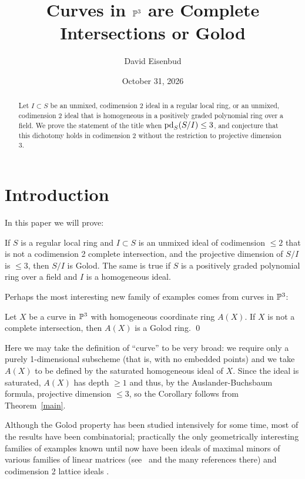 \documentclass[11pt]{amsart}
\title{Curves in \texorpdfstring{${\mathbb P}^{3}$}{P3} are Complete Intersections or Golod}
\date{October 31, 2026}                                           %
\author[D. Eisenbud]{David Eisenbud}
\begin{document}
\begin{abstract}
Let $I\subset S$ be an unmixed, codimension 2 ideal in a regular local ring, or an unmixed, codimension 2 ideal that is homogeneous in a positively graded polynomial ring over a field. We prove the statement of the title when $\operatorname{pd}_{S}(S/I) \leq 3$, 
and conjecture that this dichotomy holds in codimension 2 
without the restriction to projective dimension 3.
\end{abstract}

\maketitle

\section*{Introduction}
In this paper we will prove: 

\begin{theorem}\label{main}
If $S$ is a regular local ring and
$I\subset S$ is an unmixed ideal of codimension $\leq 2$
that is not a codimension 2 complete intersection, and the projective dimension of $S/I$ is $\leq 3$, then $S/I$ is Golod. 
The same is true if $S$ is a positively graded polynomial ring over a field and $I$ is a homogeneous ideal. \end{theorem}
  
Perhaps the most interesting new family of examples comes from curves in ${\mathbb P}^3$:

\begin{corollary}\label{GolodCurves}
 Let $X$ be a curve in ${\mathbb P}^3$ with homogeneous coordinate ring $A(X)$.
 If $X$ is not a complete intersection, then $A(X)$ is a Golod ring. \qed
\end{corollary}

Here we may take the definition of ``curve'' to be very broad: we require only a purely 1-dimensional subscheme (that is, with no embedded points) and we take $A(X)$ to be defined by the saturated homogeneous ideal of $X$. Since the ideal is saturated, $A(X)$ has depth $\geq 1$ and thus, by the Auslander-Buchsbaum formula,
projective dimension $\leq 3$, so the Corollary follows from Theorem~\ref{main}.

Although the Golod property has been studied intensively for some time, most of the results have been combinatorial; practically the only geometrically interesting families of examples known until now have been ideals of maximal minors of various families of linear matrices (see~\cite{BCD} and the many references there) and  codimension 2 lattice ideals \cite[Theorem 2.3 and Lemma 6.2]{PeevaSturmfels}.
\end{document}
